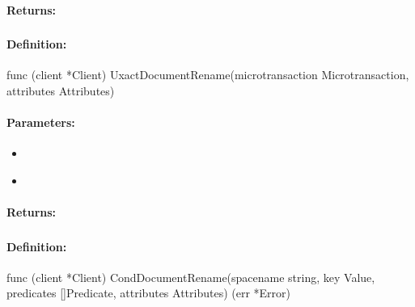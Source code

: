\paragraph{Returns:}


\pagebreak
\subsubsection{}
\label{api:Go:UxactDocumentRename}


\paragraph{Definition:}
\begin{gocode}
func (client *Client) UxactDocumentRename(microtransaction Microtransaction, attributes Attributes)
\end{gocode}

\paragraph{Parameters:}
\begin{itemize}[noitemsep]
\item {}\\

\item {}\\

\end{itemize}

\paragraph{Returns:}


\pagebreak
\subsubsection{}
\label{api:Go:CondDocumentRename}


\paragraph{Definition:}
\begin{gocode}
func (client *Client) CondDocumentRename(spacename string, key Value, predicates []Predicate, attributes Attributes) (err *Error)
\end{gocode}

